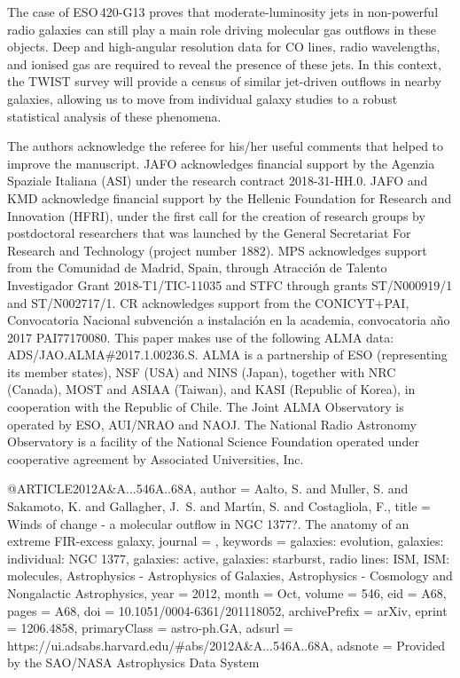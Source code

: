 \documentclass[longauth]{aa}
\begin{document}
The case of ESO\,420-G13 proves that moderate-luminosity jets in non-powerful radio galaxies can still play a main role driving molecular gas outflows in these objects. Deep and high-angular resolution data for CO lines, radio wavelengths, and ionised gas are required to reveal the presence of these jets. In this context, the TWIST survey will provide a census of similar jet-driven outflows in nearby galaxies, allowing us to move from individual galaxy studies to a robust statistical analysis of these phenomena.

\begin{acknowledgements}
The authors acknowledge the referee for his/her useful comments that helped to improve the manuscript. JAFO acknowledges financial support by the Agenzia Spaziale Italiana (ASI) under the research contract 2018-31-HH.0. JAFO and KMD acknowledge financial support by the Hellenic Foundation for Research and Innovation (HFRI), under the first call for the creation of research groups by postdoctoral researchers that was launched by the General Secretariat For Research and Technology (project number 1882). MPS acknowledges support from the Comunidad de Madrid, Spain, through Atracci\'on de Talento Investigador Grant 2018-T1/TIC-11035 and STFC through grants ST/N000919/1 and ST/N002717/1. CR acknowledges support from the CONICYT+PAI, Convocatoria Nacional subvenci\'on a instalaci\'on en la academia, convocatoria a\~no 2017 PAI77170080. This paper makes use of the following ALMA data: ADS/JAO.ALMA\#2017.1.00236.S. ALMA is a partnership of ESO (representing its member states), NSF (USA) and NINS (Japan), together with NRC (Canada), MOST and ASIAA (Taiwan), and KASI (Republic of Korea), in cooperation with the Republic of Chile. The Joint ALMA Observatory is operated by ESO, AUI/NRAO and NAOJ. The National Radio Astronomy Observatory is a facility of the National Science Foundation operated under cooperative agreement by Associated Universities, Inc.
\end{acknowledgements}


@ARTICLE{2012A&A...546A..68A,
       author = {{Aalto}, S. and {Muller}, S. and {Sakamoto}, K. and {Gallagher}, J.~S. and {Mart{\'\i}n}, S. and {Costagliola}, F.},
        title = {Winds of change - a molecular outflow in NGC 1377?. The anatomy of an extreme FIR-excess galaxy},
      journal = {\aap},
     keywords = {galaxies: evolution, galaxies: individual: NGC 1377, galaxies: active, galaxies: starburst, radio lines: ISM, ISM: molecules, Astrophysics - Astrophysics of Galaxies, Astrophysics - Cosmology and Nongalactic Astrophysics},
         year = 2012,
        month = Oct,
       volume = {546},
          eid = {A68},
        pages = {A68},
          doi = {10.1051/0004-6361/201118052},
archivePrefix = {arXiv},
       eprint = {1206.4858},
 primaryClass = {astro-ph.GA},
       adsurl = {https://ui.adsabs.harvard.edu/#abs/2012A&A...546A..68A},
      adsnote = {Provided by the SAO/NASA Astrophysics Data System}
}
\end{document}
